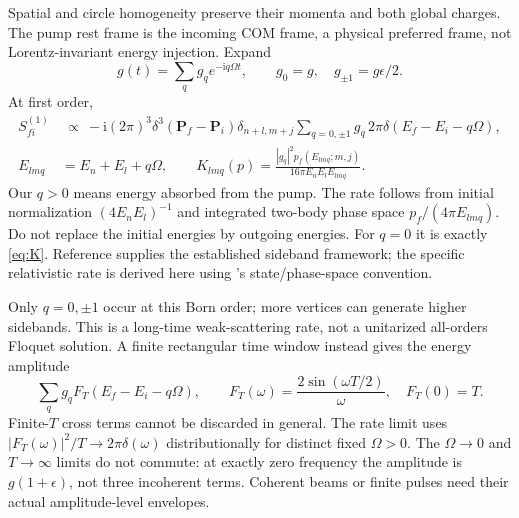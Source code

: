 \documentclass[11pt,a4paper]{article}
\begin{document}
Spatial and circle homogeneity preserve their momenta and both global
charges. The pump rest frame is the incoming COM frame, a physical
preferred frame, not Lorentz-invariant energy injection. Expand
\begin{equation}
 g(t)=\sum_qg_qe^{-\mathrm iq\Omega t},\qquad
 g_0=g,\quad g_{\pm1}=g\epsilon/2 .
\end{equation}
At first order,
\begin{align}
 S_{fi}^{(1)}&\ \propto\
 -\mathrm i(2\pi)^3\delta^3(\boldsymbol P_f-\boldsymbol P_i)
 \delta_{n+l,m+j}
 \sum_{q=0,\pm1}g_q\,2\pi\delta(E_f-E_i-q\Omega),\\
 E_{lmq}&=E_n+E_l+q\Omega,\qquad
 K_{lmq}(p)=
 \boxed{\frac{|g_q|^2p_f(E_{lmq};m,j)}
 {16\pi E_nE_lE_{lmq}}}.
 \label{eq:drivenK}
\end{align}
Our $q>0$ means energy absorbed from the pump. The rate follows from
initial normalization $(4E_nE_l)^{-1}$ and integrated two-body phase
space $p_f/(4\pi E_{lmq})$. Do not replace the initial energies by
outgoing energies. For $q=0$ it is exactly \eqref{eq:K}.
Reference \cite{floquet} supplies the established sideband framework;
the specific relativistic rate is derived here using \cite{pdg}'s
state/phase-space convention.

Only $q=0,\pm1$ occur at this Born order; more vertices can generate
higher sidebands. This is a long-time weak-scattering rate, not a
unitarized all-orders Floquet solution. A finite rectangular time
window instead gives the energy amplitude
\begin{equation}
 \sum_q g_q F_T(E_f-E_i-q\Omega),\qquad
 F_T(\omega)=\frac{2\sin(\omega T/2)}{\omega},\quad F_T(0)=T .
\end{equation}
Finite-$T$ cross terms cannot be discarded in general.
The rate limit uses $|F_T(\omega)|^2/T\to2\pi\delta(\omega)$
distributionally for distinct fixed $\Omega>0$. The
$\Omega\to0$ and $T\to\infty$ limits do not commute:
at exactly zero frequency the amplitude is $g(1+\epsilon)$, not
three incoherent terms. Coherent beams or finite pulses need their
actual amplitude-level envelopes.
\end{document}
